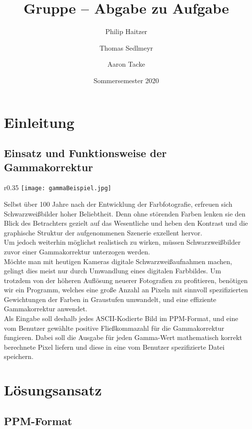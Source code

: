 \documentclass[course=erap]{aspdoc}
\author{Philip Haitzer \and Thomas Sedlmeyr \and Aaron Tacke }
\date{Sommersemester 2020} %
\title{Gruppe \theGroup{} -- Abgabe zu Aufgabe \theNumber}
\begin{document}
\maketitle

\section{Einleitung}
\subsection{Einsatz und Funktionsweise der Gammakorrektur}

\begin{wrapfigure}{r}{0.35\linewidth}
	\texttt{[image: gammaBeispiel.jpg]}
\end{wrapfigure}
Selbst über 100 Jahre nach der Entwicklung der Farbfotografie, erfreuen sich Schwarzweißbilder hoher Beliebtheit. Denn ohne störenden Farben lenken sie den Blick des Betrachters gezielt auf das Wesentliche und heben den Kontrast und die graphische Struktur der aufgenommenen Szenerie exzellent hervor.\\
Um jedoch weiterhin möglichst realistisch zu wirken, müssen Schwarzweißbilder zuvor einer Gammakorrektur unterzogen werden.\\

\noindent Möchte man mit heutigen Kameras digitale Schwarzweißaufnahmen machen, gelingt dies meist nur durch Umwandlung eines digitalen Farbbildes. Um trotzdem von der höheren Auflösung neuerer Fotografien zu profitieren, benötigen wir ein Programm, welches eine große Anzahl an Pixeln mit sinnvoll spezifizierten Gewichtungen der Farben in Graustufen umwandelt, und eine effiziente Gammakorrektur anwendet.\\

\noindent Als Eingabe soll deshalb jedes ASCII-Kodierte Bild im PPM-Format, und eine vom Benutzer gewählte positive Fließkommazahl für die Gammakorrektur fungieren. Dabei soll die Ausgabe für jeden Gamma-Wert mathematisch korrekt berechnete Pixel liefern und diese in eine vom Benutzer spezifizierte Datei speichern.



\section{Lösungsansatz}
\subsection{PPM-Format}
\end{document}
